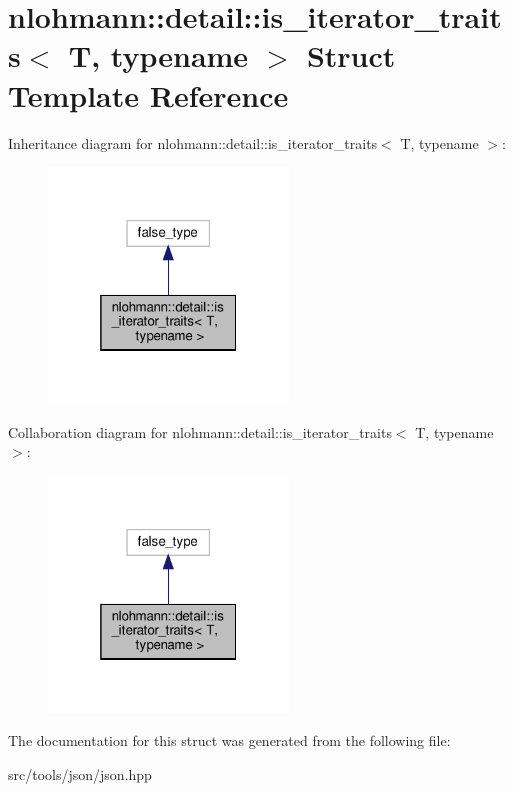 \hypertarget{structnlohmann_1_1detail_1_1is__iterator__traits}{}\section{nlohmann\+:\+:detail\+:\+:is\+\_\+iterator\+\_\+traits$<$ T, typename $>$ Struct Template Reference}
\label{structnlohmann_1_1detail_1_1is__iterator__traits}


Inheritance diagram for nlohmann\+:\+:detail\+:\+:is\+\_\+iterator\+\_\+traits$<$ T, typename $>$\+:
\nopagebreak
\begin{figure}[H]
\begin{center}
\leavevmode
\includegraphics[width=181pt]{structnlohmann_1_1detail_1_1is__iterator__traits__inherit__graph}
\end{center}
\end{figure}


Collaboration diagram for nlohmann\+:\+:detail\+:\+:is\+\_\+iterator\+\_\+traits$<$ T, typename $>$\+:
\nopagebreak
\begin{figure}[H]
\begin{center}
\leavevmode
\includegraphics[width=181pt]{structnlohmann_1_1detail_1_1is__iterator__traits__coll__graph}
\end{center}
\end{figure}


The documentation for this struct was generated from the following file\+:\begin{DoxyCompactItemize}
\item 
src/tools/json/json.\+hpp\end{DoxyCompactItemize}
